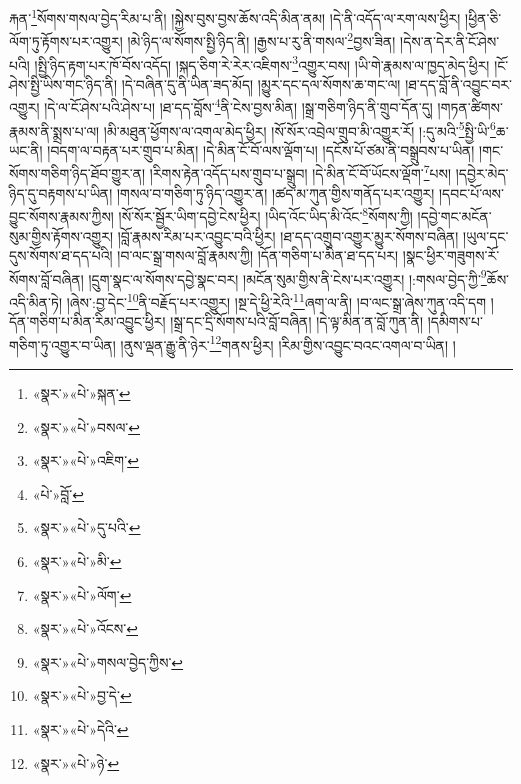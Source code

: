 རྐན་\footnote{«སྣར་»«པེ་»སྐན་}སོགས་གསལ་བྱེད་རིམ་པ་ནི། །སྐྱེས་བུས་བྱས་ཆོས་འདི་མིན་ནམ། །དེ་ནི་འདོད་ལ་རག་ལས་ཕྱིར། །ཕྱིན་ཅི་ལོག་ཏུ་རྟོགས་པར་འགྱུར། །མེ་ཉིད་ལ་སོགས་སྤྱི་ཉིད་ནི། །རྒྱས་པ་རུ་ནི་གསལ་\footnote{«སྣར་»«པེ་»བསལ་}བྱས་ཟིན། །དེས་ན་དེར་ནི་ངོ་ཤེས་པའི། །སྤྱི་ཉིད་རྟག་པར་ཁོ་བོས་འདོད། །སྐད་ཅིག་རེ་རེར་འཇིགས་\footnote{«སྣར་»«པེ་»འཇིག་}འགྱུར་བས། །ཡི་གེ་རྣམས་ལ་ཁྱད་མེད་ཕྱིར། །ངོ་ཤེས་སྤྱི་ཡིས་གང་ཉིད་ནི། །དེ་བཞིན་དུ་ནི་ཡིན་ཟད་མོད། །མྱུར་དང་དལ་སོགས་ཆ་གང་ལ། །ཐ་དད་བློ་ནི་འབྱུང་བར་འགྱུར། །དེ་ལ་ངོ་ཤེས་པའི་ཤེས་པ། །ཐ་དད་བློས་\footnote{«པེ་»བློ་}ནི་ངེས་བྱས་མིན། །སྒྲ་གཅིག་ཉིད་ནི་གྲུབ་དོན་དུ། །གཏན་ཚིགས་རྣམས་ནི་སྨྲས་པ་ལ། །མི་མཐུན་ཕྱོགས་ལ་འགལ་མེད་ཕྱིར། །སོ་སོར་འབྲེལ་གྲུབ་མི་འགྱུར་རོ། །:དུ་མའི་\footnote{«སྣར་»«པེ་»དུ་པའི་}སྤྱི་ཡི་\footnote{«སྣར་»«པེ་»མི་}ཆ་ཡང་ནི། །བདག་ལ་བརྟན་པར་གྲུབ་པ་མིན། །དེ་མིན་ངོ་བོ་ལས་ལྡོག་པ། །དངོས་པོ་ཙམ་ནི་བསྒྲུབས་པ་ཡིན། །གང་སོགས་གཅིག་ཉིད་ཐོབ་གྱུར་ན། །རིགས་རྟེན་འདོད་པས་གྲུབ་པ་སྒྲུབ། །དེ་མིན་ངོ་བོ་ཡོངས་ལྡོག་\footnote{«སྣར་»«པེ་»ལོག་}པས། །དབྱེར་མེད་ཉིད་དུ་བརྟགས་པ་ཡིན། །གསལ་བ་གཅིག་ཏུ་ཉིད་འགྱུར་ན། །ཚད་མ་ཀུན་གྱིས་གནོད་པར་འགྱུར། །དབང་པོ་ལས་བྱུང་སོགས་རྣམས་ཀྱིས། །སོ་སོར་སྦྱོར་ཡིག་དབྱེ་ངེས་ཕྱིར། །ཡིད་འོང་ཡིད་མི་འོང་\footnote{«སྣར་»«པེ་»འོངས་}སོགས་ཀྱི། །དབྱེ་གང་མངོན་སུམ་གྱིས་རྟོགས་འགྱུར། །བློ་རྣམས་རིམ་པར་འབྱུང་བའི་ཕྱིར། །ཐ་དད་འགྲུབ་འགྱུར་མྱུར་སོགས་བཞིན། །ཡུལ་དང་དུས་སོགས་ཐ་དད་པའི། །བ་ལང་སྒྲ་གསལ་བློ་རྣམས་ཀྱི། །དོན་གཅིག་པ་མིན་ཐ་དད་པར། །སྣང་ཕྱིར་གཟུགས་རོ་སོགས་བློ་བཞིན། །དྲུག་སྣང་ལ་སོགས་དབྱེ་སྣང་བར། །མངོན་སུམ་གྱིས་ནི་ངེས་པར་འགྱུར། །:གསལ་བྱེད་ཀྱི་\footnote{«སྣར་»«པེ་»གསལ་བྱེད་ཀྱིས་}ཆོས་འདི་མིན་ཏེ། །ཞེས་:བྱ་དེང་\footnote{«སྣར་»«པེ་»བྱ་དེ་}ནི་བརྗོད་པར་འགྱུར། །སྔ་དེ་ཕྱི་རེའི་\footnote{«སྣར་»«པེ་»དེའི་}ཞག་ལ་ནི། །བ་ལང་སྒྲ་ཞེས་ཀུན་འདི་དག །དོན་གཅིག་པ་མིན་རིམ་འབྱུང་ཕྱིར། །སྒྲ་དང་དྲི་སོགས་པའི་བློ་བཞིན། །དེ་ལྟ་མིན་ན་བློ་ཀུན་ནི། །དམིགས་པ་གཅིག་ཏུ་འགྱུར་བ་ཡིན། །ནུས་ལྡན་རྒྱུ་ནི་ཉེར་\footnote{«སྣར་»«པེ་»ཉེ་}གནས་ཕྱིར། །རིམ་གྱིས་འབྱུང་བའང་འགལ་བ་ཡིན། །
